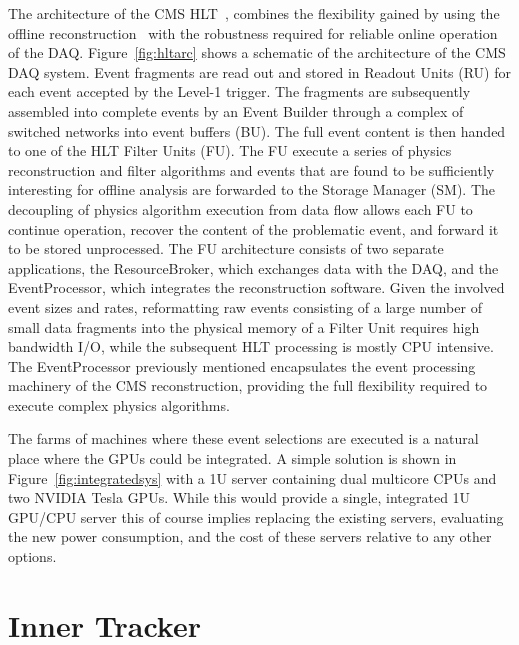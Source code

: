 \documentclass{JINST}
\begin{document}
The architecture of the CMS HLT~\cite{bib:TDR2},\cite{bib:HLT} combines the flexibility gained by using the offline
reconstruction~\cite{bib:datamodel} with the robustness required for reliable online operation of the DAQ. Figure~\ref{fig:hltarc} shows 
a schematic of the architecture of the CMS DAQ system. Event fragments are read out and stored in Readout Units (RU) for each event accepted
by the Level-1 trigger. The fragments are subsequently assembled into complete events by an Event Builder through a complex of switched 
networks into event buffers (BU). The full event content is then handed to one of the HLT Filter Units (FU). The FU execute a series of 
physics reconstruction and filter algorithms and events that are found to be sufficiently interesting for offline analysis are forwarded 
to the Storage Manager (SM). The decoupling of physics algorithm execution from data flow allows each FU to continue operation, recover the
content of the problematic event, and forward it to be stored unprocessed. The FU architecture consists of 
two separate applications, the ResourceBroker, which exchanges data with the DAQ, and the EventProcessor, which integrates the reconstruction
software. Given the involved event sizes and rates, reformatting raw events consisting of a large number of small data fragments into the physical 
memory of a Filter Unit requires high bandwidth I/O, while the subsequent HLT processing is mostly CPU intensive.
The EventProcessor previously mentioned encapsulates the event processing machinery of the CMS reconstruction, providing the full flexibility 
required to execute complex physics algorithms. 

The farms of machines where these event selections are executed is a natural place where the GPUs could be integrated.
A simple solution is shown in Figure~\ref{fig:integratedsys} with a 1U server containing dual multicore CPUs and two NVIDIA Tesla GPUs. 
While this would provide a single, integrated 1U GPU/CPU server this of course implies replacing the existing servers, 
evaluating the new power consumption, and the cost of these servers relative to any other options.



\section{Inner Tracker}
\end{document}
